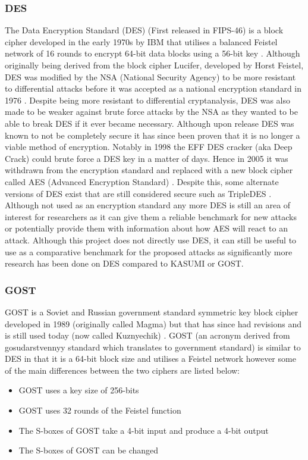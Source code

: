 \documentclass[10pt,journal,compsoc]{IEEEtran}
\begin{document}
\subsubsection{DES}
The Data Encryption Standard (DES) (First released in FIPS-46) is a block cipher developed in the early 1970s by IBM that utilises a balanced Feistel network of 16 rounds to encrypt 64-bit data blocks using a 56-bit key \cite{pub1999data}. Although originally being derived from the block cipher Lucifer, developed by Horst Feistel, DES was modified by the NSA (National Security Agency) to be more resistant to differential attacks before it was accepted as a national encryption standard in 1976  \cite{5389567}. Despite being more resistant to differential cryptanalysis, DES was also made to be weaker against brute force attacks by the NSA as they wanted to be able to break DES if it ever became necessary. Although upon release DES was known to not be completely secure it has since been proven that it is no longer a viable method of encryption. Notably in 1998 the EFF DES cracker (aka Deep Crack) \cite{10.5555/551916} could brute force a DES key in a matter of days. Hence in 2005 it was withdrawn from the encryption standard and replaced with a new block cipher called AES (Advanced Encryption Standard) \cite{daemen1999aes}. Despite this, some alternate versions of DES exist that are still considered secure such as TripleDES \cite{233626}. Although not used as an encryption standard any more DES is still an area of interest for researchers as it can give them a reliable benchmark for new attacks or potentially provide them with information about how AES will react to an attack. Although this project does not directly use DES, it can still be useful to use as a comparative benchmark for the proposed attacks as significantly more research has been done on DES compared to KASUMI or GOST.
\subsubsection{GOST}
GOST is a Soviet and Russian government standard symmetric key block cipher developed in 1989 (originally called Magma) \cite{rfc5830} but that has since had revisions and is still used today (now called Kuznyechik) \cite{rfc7801}. GOST (an acronym derived from gosudarstvennyy standard which translates to government standard) is similar to DES in that it is a 64-bit block size and utilises a Feistel network however some of the main differences between the two ciphers are listed below:
\begin{itemize}
    \item GOST uses a key size of 256-bits
    \item GOST uses 32 rounds of the Feistel function
    \item The S-boxes of GOST take a 4-bit input and produce a 4-bit output
    \item The S-boxes of GOST can be changed
\end{itemize}
\end{document}
